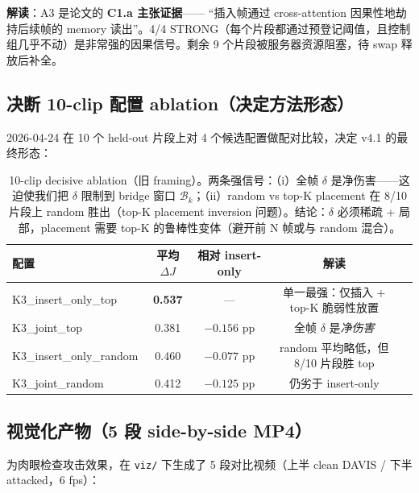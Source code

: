 \documentclass[11pt,a4paper]{ctexart}
\begin{document}
\textbf{解读}：A3 是论文的 \textbf{C1.a 主张证据}—— ``插入帧通过 cross-attention 因果性地劫持后续帧的 memory 读出''。4/4 STRONG（每个片段都通过预登记阈值，且控制组几乎不动）是非常强的因果信号。剩余 9 个片段被服务器资源阻塞，待 swap 释放后补全。

\subsection{决断 10-clip 配置 ablation（决定方法形态）}

2026-04-24 在 10 个 held-out 片段上对 4 个候选配置做配对比较，决定 v4.1 的最终形态：

\begin{table}[h]
\centering
\small
\begin{tabular}{lcccc}
\toprule
\textbf{配置} & \textbf{平均 $\Delta J$} & \textbf{相对 insert-only} & \textbf{解读} \\
\midrule
K3\_insert\_only\_top    & \textbf{0.537} & --- & 单一最强：仅插入 + top-K 脆弱性放置 \\
K3\_joint\_top           & 0.381 & $-0.156$ pp & 全帧 $\delta$ 是\emph{净伤害} \\
K3\_insert\_only\_random & 0.460 & $-0.077$ pp & random 平均略低，但 8/10 片段胜 top \\
K3\_joint\_random        & 0.412 & $-0.125$ pp & 仍劣于 insert-only \\
\bottomrule
\end{tabular}
\caption{10-clip decisive ablation（旧 framing）。两条强信号：（i）全帧 $\delta$ 是净伤害——这迫使我们把 $\delta$ 限制到 bridge 窗口 $\mathcal{B}_k$；（ii）random vs top-K placement 在 8/10 片段上 random 胜出（top-K placement inversion 问题）。结论：$\delta$ 必须稀疏 + 局部，placement 需要 top-K 的鲁棒性变体（避开前 N 帧或与 random 混合）。}
\label{tab:decisive}
\end{table}

\subsection{视觉化产物（5 段 side-by-side MP4）}

为肉眼检查攻击效果，在 \texttt{viz/} 下生成了 5 段对比视频（上半 clean DAVIS / 下半 attacked，6 fps）：
\end{document}
